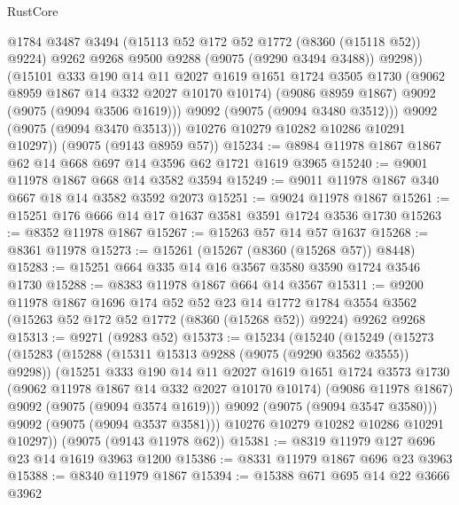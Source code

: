 \begin{lexlean}{RustCore}
\begin{coremodule}
                @1784
                @3487
                @3494
                (@15113 @52 @172 @52 @1772 (@8360 (@15118 @52)) @9224)
                @9262
                @9268
                @9500
                @9288
                (@9075 (@9290 @3494 @3488))
                @9298))
            (@15101
              @333
              @190
              @14
              @11
              @2027
              @1619
              @1651
              @1724
              @3505
              @1730
              (@9062 @8959 @1867 @14 @332 @2027 @10170 @10174)
              (@9086 @8959 @1867)
              @9092
              (@9075 (@9094 @3506 @1619)))
            @9092
            (@9075 (@9094 @3480 @3512)))
          @9092
          (@9075 (@9094 @3470 @3513)))
        @10276
        @10279
        @10282
        @10286
        @10291
        @10297))
    (@9075 (@9143 @8959 @57))
@15234 := @8984 @11978 @1867 @1867 @62 @14 @668 @697 @14 @3596 @62 @1721 @1619 @3965
@15240 := @9001 @11978 @1867 @668 @14 @3582 @3594
@15249 := @9011 @11978 @1867 @340 @667 @18 @14 @3582 @3592 @2073
@15251 := @9024 @11978 @1867
@15261 := @15251 @176 @666 @14 @17 @1637 @3581 @3591 @1724 @3536 @1730
@15263 := @8352 @11978 @1867
@15267 := @15263 @57 @14 @57 @1637
@15268 := @8361 @11978
@15273 := @15261 (@15267 (@8360 (@15268 @57)) @8448)
@15283 := @15251 @664 @335 @14 @16 @3567 @3580 @3590 @1724 @3546 @1730
@15288 := @8383 @11978 @1867 @664 @14 @3567
@15311 := @9200
    @11978
    @1867
    @1696
    @174
    @52
    @52
    @23
    @14
    @1772
    @1784
    @3554
    @3562
    (@15263 @52 @172 @52 @1772 (@8360 (@15268 @52)) @9224)
    @9262
    @9268
@15313 := @9271 (@9283 @52)
@15373 := @15234
    (@15240
      (@15249
        (@15273
          (@15283
            (@15288 (@15311 @15313 @9288 (@9075 (@9290 @3562 @3555)) @9298))
            (@15251
              @333
              @190
              @14
              @11
              @2027
              @1619
              @1651
              @1724
              @3573
              @1730
              (@9062 @11978 @1867 @14 @332 @2027 @10170 @10174)
              (@9086 @11978 @1867)
              @9092
              (@9075 (@9094 @3574 @1619)))
            @9092
            (@9075 (@9094 @3547 @3580)))
          @9092
          (@9075 (@9094 @3537 @3581)))
        @10276
        @10279
        @10282
        @10286
        @10291
        @10297))
    (@9075 (@9143 @11978 @62))
@15381 := @8319 @11979 @127 @696 @23 @14 @1619 @3963 @1200
@15386 := @8331 @11979 @1867 @696 @23 @3963
@15388 := @8340 @11979 @1867
@15394 := @15388 @671 @695 @14 @22 @3666 @3962

\end{coremodule}
\end{lexlean}
